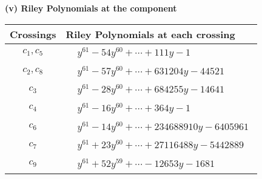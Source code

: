 \documentclass[1p]{elsarticle_modified}
\theoremstyle{definition}
\begin{document}
\newpage\renewcommand{\arraystretch}{1}
\flushleft \textbf{(v) Riley Polynomials at the component}\newline \\
\begin{tabular}{m{50pt}|m{274pt}}
Crossings & \hspace{64pt}Riley Polynomials at each crossing \\
\hline $$\begin{aligned}c_{1},c_{5}\end{aligned}$$&$\begin{aligned}
&y^{61}-54 y^{60}+\cdots+111 y-1
\end{aligned}$\\
\hline $$\begin{aligned}c_{2},c_{8}\end{aligned}$$&$\begin{aligned}
&y^{61}-57 y^{60}+\cdots+631204 y-44521
\end{aligned}$\\
\hline $$\begin{aligned}c_{3}\end{aligned}$$&$\begin{aligned}
&y^{61}-28 y^{60}+\cdots+684255 y-14641
\end{aligned}$\\
\hline $$\begin{aligned}c_{4}\end{aligned}$$&$\begin{aligned}
&y^{61}-16 y^{60}+\cdots+364 y-1
\end{aligned}$\\
\hline $$\begin{aligned}c_{6}\end{aligned}$$&$\begin{aligned}
&y^{61}-14 y^{60}+\cdots+234688910 y-6405961
\end{aligned}$\\
\hline $$\begin{aligned}c_{7}\end{aligned}$$&$\begin{aligned}
&y^{61}+23 y^{60}+\cdots+27116488 y-5442889
\end{aligned}$\\
\hline $$\begin{aligned}c_{9}\end{aligned}$$&$\begin{aligned}
&y^{61}+52 y^{59}+\cdots-12653 y-1681
\end{aligned}$\\

\end{tabular}
\end{document}
